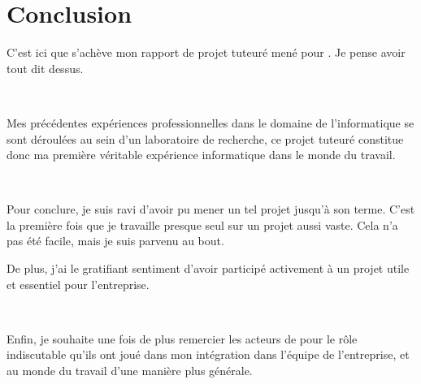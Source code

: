 \chapter*{Conclusion}
C'est ici que s'achève mon rapport de projet tuteuré mené pour \solulog. Je pense avoir tout dit dessus.

~

Mes précédentes expériences professionnelles dans le domaine de l'informatique se sont déroulées au sein d'un laboratoire de recherche, ce projet tuteuré constitue donc ma première véritable expérience informatique dans le monde du travail.

~

Pour conclure, je suis ravi d'avoir pu mener un tel projet jusqu'à son terme. C'est la première fois que je travaille presque seul sur un projet aussi vaste. Cela n'a pas été facile, mais je suis parvenu au bout.

De plus, j'ai le gratifiant sentiment d'avoir participé activement à un projet utile et essentiel pour l'entreprise.

~

Enfin, je souhaite une fois de plus remercier les acteurs de \solulog{} pour le rôle indiscutable qu'ils ont joué dans mon intégration dans l'équipe de l'entreprise, et au monde du travail d'une manière plus générale.